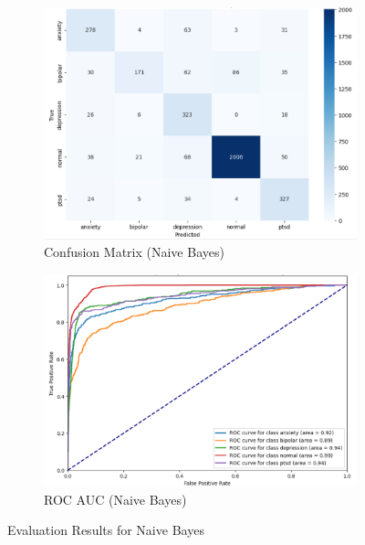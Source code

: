 \vspace{0.25em}

\begin{figure}[h!]
    \centering
    \begin{subfigure}[b]{0.49\textwidth}
        \centering
        \includegraphics[width=\textwidth]{Images/NB Confusion Matrix.png}
        \caption{Confusion Matrix (Naive Bayes)}
        \label{NBCM}  %
    \end{subfigure}
    \hfill
    \begin{subfigure}[b]{0.49\textwidth}
        \centering
        \includegraphics[width=\textwidth]{Images/NB ROC.png}
        \caption{ROC AUC (Naive Bayes)}
        \label{NBROC}  %
    \end{subfigure}
    \caption{Evaluation Results for Naive Bayes}
    \label{fig:nb_comparison}
\end{figure}

